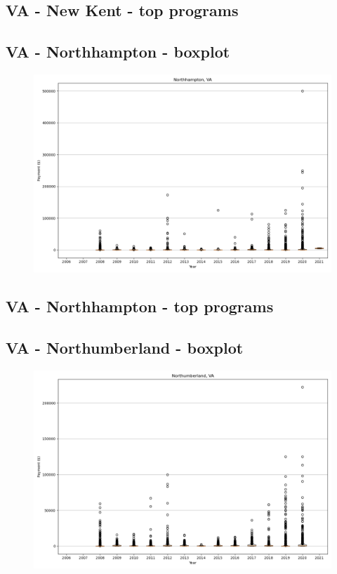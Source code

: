 \subsection*{VA - New Kent - top programs}

\newpage
\subsection*{VA - Northhampton - boxplot}
\begin{figure}[h]
\centering
\includegraphics[width=7in]{../output/boxplots/counties/Northhampton-VA_boxplot.png}
\end{figure}


\subsection*{VA - Northhampton - top programs}

\newpage
\subsection*{VA - Northumberland - boxplot}
\begin{figure}[h]
\centering
\includegraphics[width=7in]{../output/boxplots/counties/Northumberland-VA_boxplot.png}
\end{figure}


